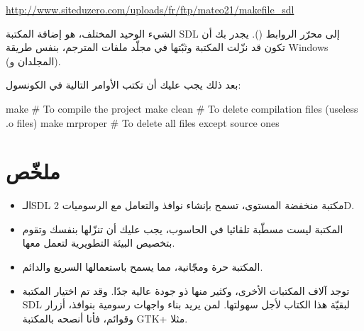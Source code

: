 \url{http://www.siteduzero.com/uploads/fr/ftp/mateo21/makefile_sdl}

الشيء الوحيد المختلف، هو إضافة المكتبة
\textenglish{SDL}
إلى محرّر الروابط
().
يجدر بك أن تكون قد نزّلت المكتبة وثبّتها في مجلّد ملفات المترجم، بنفس طريقة
\textenglish{Windows}
(المجلدان
و).

بعد ذلك يجب عليك أن تكتب الأوامر التالية في الكونسول:

\begin{Console}
make      	# To compile the project
make clean	# To delete compilation files (useless .o files)
make mrproper	# To delete all files except source ones
\end{Console}

\section*{ملخّص}

\begin{itemize}
	\item الـ\textenglish{SDL}
	مكتبة منخفضة المستوى، تسمح بإنشاء نوافذ والتعامل مع الرسوميات
	\textenglish{2D}.
	\item المكتبة ليست مسطّبة تلقائيا في الحاسوب، يجب عليك أن تنزّلها بنفسك وتقوم بتخصيص البيئة التطويرية لتعمل معها.
	\item المكتبة حرة ومجّانية، مما يسمح باستعمالها السريع والدائم.
	\item توجد آلاف المكتبات الأخرى، وكثير منها ذو جودة عالية جدًا. وقد تم اختيار المكتبة 
	\textenglish{SDL}
	لبقيّة هذا الكتاب لأجل سهولتها. لمن يريد بناء واجهات رسومية بنوافذ، أزرار وقوائم، فأنا أنصحه بالمكتبة 
	\textenglish{GTK+}
	مثلا.
\end{itemize}
